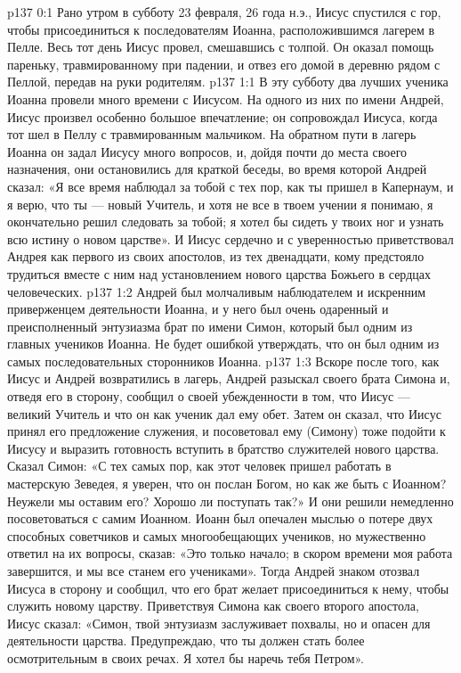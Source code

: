 \author{Комиссия срединников}
\vs p137 0:1 Рано утром в субботу 23 февраля, 26 года н.э., Иисус спустился с гор, чтобы присоединиться к последователям Иоанна, расположившимся лагерем в Пелле. Весь тот день Иисус провел, смешавшись с толпой. Он оказал помощь пареньку, травмированному при падении, и отвез его домой в деревню рядом с Пеллой, передав на руки родителям.
\vs p137 1:1 В эту субботу два лучших ученика Иоанна провели много времени с Иисусом. На одного из них по имени Андрей, Иисус произвел особенно большое впечатление; он сопровождал Иисуса, когда тот шел в Пеллу с травмированным мальчиком. На обратном пути в лагерь Иоанна он задал Иисусу много вопросов, и, дойдя почти до места своего назначения, они остановились для краткой беседы, во время которой Андрей сказал: «Я все время наблюдал за тобой с тех пор, как ты пришел в Капернаум, и я верю, что ты --- новый Учитель, и хотя не все в твоем учении я понимаю, я окончательно решил следовать за тобой; я хотел бы сидеть у твоих ног и узнать всю истину о новом царстве». И Иисус сердечно и с уверенностью приветствовал Андрея как первого из своих апостолов, из тех двенадцати, кому предстояло трудиться вместе с ним над установлением нового царства Божьего в сердцах человеческих.
\vs p137 1:2 \pc Андрей был молчаливым наблюдателем и искренним приверженцем деятельности Иоанна, и у него был очень одаренный и преисполненный энтузиазма брат по имени Симон, который был одним из главных учеников Иоанна. Не будет ошибкой утверждать, что он был одним из самых последовательных сторонников Иоанна.
\vs p137 1:3 Вскоре после того, как Иисус и Андрей возвратились в лагерь, Андрей разыскал своего брата Симона и, отведя его в сторону, сообщил о своей убежденности в том, что Иисус --- великий Учитель и что он как ученик дал ему обет. Затем он сказал, что Иисус принял его предложение служения, и посоветовал ему (Симону) тоже подойти к Иисусу и выразить готовность вступить в братство служителей нового царства. Сказал Симон: «С тех самых пор, как этот человек пришел работать в мастерскую Зеведея, я уверен, что он послан Богом, но как же быть с Иоанном? Неужели мы оставим его? Хорошо ли поступать так?» И они решили немедленно посоветоваться с самим Иоанном. Иоанн был опечален мыслью о потере двух способных советчиков и самых многообещающих учеников, но мужественно ответил на их вопросы, сказав: «Это только начало; в скором времени моя работа завершится, и мы все станем его учениками». Тогда Андрей знаком отозвал Иисуса в сторону и сообщил, что его брат желает присоединиться к нему, чтобы служить новому царству. Приветствуя Симона как своего второго апостола, Иисус сказал: «Симон, твой энтузиазм заслуживает похвалы, но и опасен для деятельности царства. Предупреждаю, что ты должен стать более осмотрительным в своих речах. Я хотел бы наречь тебя Петром».
